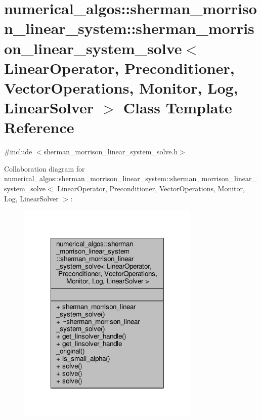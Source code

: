 \hypertarget{classnumerical__algos_1_1sherman__morrison__linear__system_1_1sherman__morrison__linear__system__solve}{\section{numerical\-\_\-algos\-:\-:sherman\-\_\-morrison\-\_\-linear\-\_\-system\-:\-:sherman\-\_\-morrison\-\_\-linear\-\_\-system\-\_\-solve$<$ Linear\-Operator, Preconditioner, Vector\-Operations, Monitor, Log, Linear\-Solver $>$ Class Template Reference}
\label{classnumerical__algos_1_1sherman__morrison__linear__system_1_1sherman__morrison__linear__system__solve}
}


{\ttfamily \#include $<$sherman\-\_\-morrison\-\_\-linear\-\_\-system\-\_\-solve.\-h$>$}



Collaboration diagram for numerical\-\_\-algos\-:\-:sherman\-\_\-morrison\-\_\-linear\-\_\-system\-:\-:sherman\-\_\-morrison\-\_\-linear\-\_\-system\-\_\-solve$<$ Linear\-Operator, Preconditioner, Vector\-Operations, Monitor, Log, Linear\-Solver $>$\-:
\nopagebreak
\begin{figure}[H]
\begin{center}
\leavevmode
\includegraphics[width=246pt]{classnumerical__algos_1_1sherman__morrison__linear__system_1_1sherman__morrison__linear__system__solve__coll__graph}
\end{center}
\end{figure}
